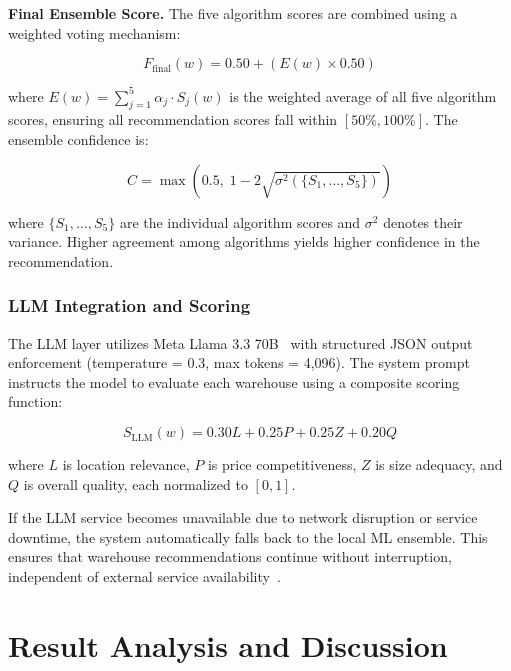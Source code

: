 \documentclass[pdflatex,sn-mathphys-num]{sn-jnl}
\theoremstyle{thmstyleone}
\theoremstyle{thmstyletwo}
\theoremstyle{thmstylethree}
\begin{document}
\textbf{Final Ensemble Score.} The five algorithm scores are combined using a weighted voting mechanism:

\begin{equation}
F_{\text{final}}(w) = 0.50 + \left(E(w) \times 0.50\right)
\label{eq:final}
\end{equation}

\noindent where $E(w) = \sum_{j=1}^{5} \alpha_j \cdot S_j(w)$ is the weighted average of all five algorithm scores, ensuring all recommendation scores fall within $[50\%, 100\%]$. The ensemble confidence is:

\begin{equation}
C = \max\!\left(0.5,\; 1 - 2\sqrt{\sigma^2\!\left(\{S_1, \ldots, S_5\}\right)}\right)
\label{eq:confidence}
\end{equation}

\noindent where $\{S_1, \ldots, S_5\}$ are the individual algorithm scores and $\sigma^2$ denotes their variance. Higher agreement among algorithms yields higher confidence in the recommendation.

\subsubsection{LLM Integration and Scoring}\label{subsubsec:llm-integration}

The LLM layer utilizes Meta Llama 3.3 70B~\cite{b13} with structured JSON output enforcement (temperature = 0.3, max tokens = 4,096). The system prompt instructs the model to evaluate each warehouse using a composite scoring function:

\begin{equation}
S_{\text{LLM}}(w) = 0.30L + 0.25P + 0.25Z + 0.20Q
\label{eq:llm}
\end{equation}

\noindent where $L$ is location relevance, $P$ is price competitiveness, $Z$ is size adequacy, and $Q$ is overall quality, each normalized to $[0, 1]$.

If the LLM service becomes unavailable due to network disruption or service downtime, the system automatically falls back to the local ML ensemble. This ensures that warehouse recommendations continue without interruption, independent of external service availability~\cite{b7}.


\section{Result Analysis and Discussion}\label{sec5}
\end{document}
